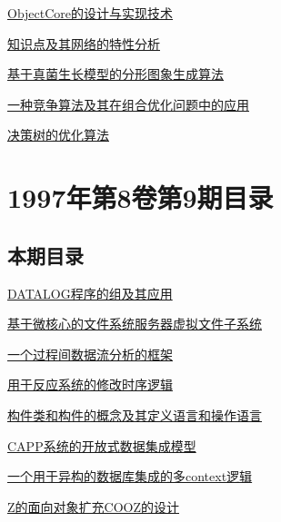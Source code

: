 \documentclass[a4paper]{article}
\begin{document}
\href{http://www.jos.org.cn/ch/reader/download_pdf.aspx?file_no=19981011&year_id=1998&quarter_id=10&falg=1}{ObjectCore的设计与实现技术}

\href{http://www.jos.org.cn/ch/reader/download_pdf.aspx?file_no=19981012&year_id=1998&quarter_id=10&falg=1}{知识点及其网络的特性分析}

\href{http://www.jos.org.cn/ch/reader/download_pdf.aspx?file_no=19981013&year_id=1998&quarter_id=10&falg=1}{基于真菌生长模型的分形图象生成算法}

\href{http://www.jos.org.cn/ch/reader/download_pdf.aspx?file_no=19981014&year_id=1998&quarter_id=10&falg=1}{一种竞争算法及其在组合优化问题中的应用}

\href{http://www.jos.org.cn/ch/reader/download_pdf.aspx?file_no=19981015&year_id=1998&quarter_id=10&falg=1}{决策树的优化算法}


\section{\textbf{1997年第8卷第9期目录}}
\subsection{本期目录}
\href{http://www.jos.org.cn/ch/reader/download_pdf.aspx?file_no=19970901&year_id=1997&quarter_id=9&falg=1}{DATALOG程序的组及其应用}

\href{http://www.jos.org.cn/ch/reader/download_pdf.aspx?file_no=19970902&year_id=1997&quarter_id=9&falg=1}{基于微核心的文件系统服务器虚拟文件子系统}

\href{http://www.jos.org.cn/ch/reader/download_pdf.aspx?file_no=19970903&year_id=1997&quarter_id=9&falg=1}{一个过程间数据流分析的框架}

\href{http://www.jos.org.cn/ch/reader/download_pdf.aspx?file_no=19970904&year_id=1997&quarter_id=9&falg=1}{用于反应系统的修改时序逻辑}

\href{http://www.jos.org.cn/ch/reader/download_pdf.aspx?file_no=19970905&year_id=1997&quarter_id=9&falg=1}{构件类和构件的概念及其定义语言和操作语言}

\href{http://www.jos.org.cn/ch/reader/download_pdf.aspx?file_no=19970906&year_id=1997&quarter_id=9&falg=1}{CAPP系统的开放式数据集成模型}

\href{http://www.jos.org.cn/ch/reader/download_pdf.aspx?file_no=19970907&year_id=1997&quarter_id=9&falg=1}{一个用于异构的数据库集成的多context逻辑}

\href{http://www.jos.org.cn/ch/reader/download_pdf.aspx?file_no=19970908&year_id=1997&quarter_id=9&falg=1}{Z的面向对象扩充COOZ的设计}
\end{document}
